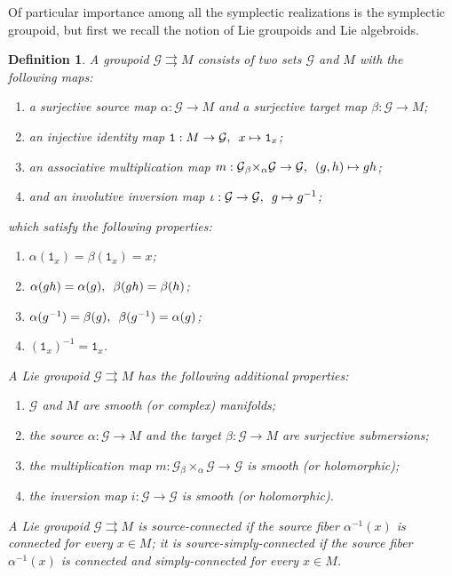 \documentclass{amsart}
\newtheorem{definition}[theorem]{Definition}
\numberwithin{equation}{section}
\newcommand{\cG}{\mathcal{G}}
\begin{document}
Of particular importance among all the symplectic realizations is the symplectic groupoid, but first we recall the notion of Lie groupoids and Lie algebroids.
\begin{definition} \label{def:groupoid}
  A \emph{groupoid} $\cG\rightrightarrows M$ consists of two sets $\cG$ and $M$ with the following maps:
  \begin{enumerate}
    \item a surjective \emph{source map} $\alpha: \cG \to M$ and a surjective \emph{target map} $\beta: \cG \to M$;
    \item an injective identity map $\mathtt{1}: M \to \cG, \enskip x \mapsto \mathtt{1}_x$;
    \item an associative multiplication map $m: \cG {_\beta \times_\alpha} \cG \to \cG, \enskip (g, h) \mapsto gh$;
    \item and an involutive inversion map $\iota: \cG \to \cG, \enskip g \mapsto g^{-1}$;
  \end{enumerate}
  which satisfy the following properties:
  \begin{enumerate}
    \item $\alpha(\mathtt{1}_x) = \beta(\mathtt{1}_x) = x$;
    \item $\alpha(gh) = \alpha(g), \enskip \beta(gh) = \beta(h)$;
    \item $\alpha(g^{-1}) = \beta(g), \enskip \beta(g^{-1}) = \alpha(g)$;
    \item $(\mathtt{1}_x)^{-1} = \mathtt{1}_x$.
  \end{enumerate}
  A \emph{Lie groupoid} $\cG \rightrightarrows M$ has the following additional properties:
  \begin{enumerate}
    \item $\cG$ and $M$ are smooth (or complex) manifolds;
    \item the source $\alpha: \cG \to M$ and the target $\beta: \cG \to M$ are surjective submersions;
    \item the multiplication map $m: \cG {_\beta \times_\alpha} \cG \to \cG$ is smooth (or holomorphic);
    \item the inversion map $i: \cG \to \cG$ is smooth (or holomorphic).
  \end{enumerate}
  A Lie groupoid $\cG \rightrightarrows M$ is \emph{source-connected} if the source fiber $\alpha^{-1}(x)$ is connected for every $x \in M$; it is \emph{source-simply-connected} if the source fiber $\alpha^{-1}(x)$ is connected and simply-connected for every $x \in M$.
\end{definition}
\end{document}
